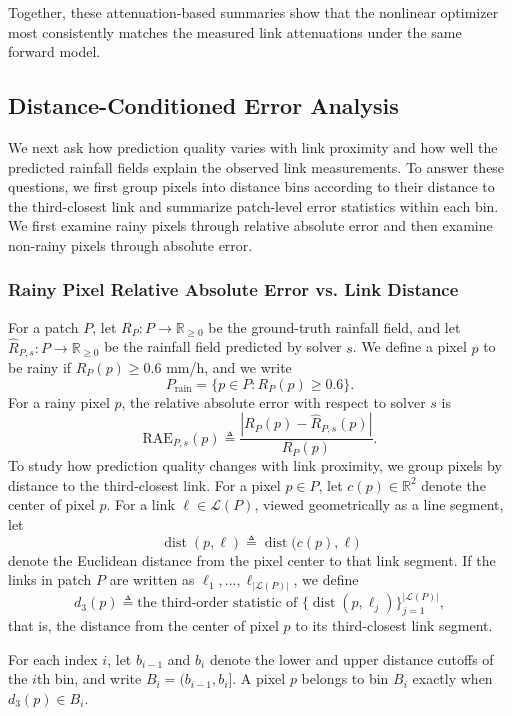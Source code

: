 Together, these attenuation-based summaries show that the nonlinear optimizer most consistently matches the measured link attenuations under the same forward model.

\subsection{Distance-Conditioned Error Analysis}
We next ask how prediction quality varies with link proximity and how well the predicted rainfall fields explain the observed link measurements. To answer these questions, we first group pixels into distance bins according to their distance to the third-closest link and summarize patch-level error statistics within each bin. We first examine rainy pixels through relative absolute error and then examine non-rainy pixels through absolute error.

\subsubsection{Rainy Pixel Relative Absolute Error vs. Link Distance}
For a patch $P$, let $R_P : P \to \mathbb{R}_{\ge 0}$ be the ground-truth rainfall field, and let $\widehat{R}_{P,s} : P \to \mathbb{R}_{\ge 0}$ be the rainfall field predicted by solver $s$. We define a pixel $p$ to be rainy if $R_P(p) \ge 0.6$ mm/h, and we write
\[
P_{\mathrm{rain}}=\{p \in P : R_P(p)\ge 0.6\}.
\]
For a rainy pixel $p$, the relative absolute error with respect to solver $s$ is
\[
\mathrm{RAE}_{P,s}(p)\triangleq\frac{|R_P(p)-\widehat{R}_{P,s}(p)|}{R_P(p)}.
\]
To study how prediction quality changes with link proximity, we group pixels by distance to the third-closest link. For a pixel $p\in P$, let $c(p)\in\mathbb{R}^2$ denote the center of pixel $p$. For a link $\ell\in\mathcal{L}(P)$, viewed geometrically as a line segment, let
\[
\operatorname{dist}(p,\ell)\triangleq \operatorname{dist}\bigl(c(p),\ell\bigr)
\]
denote the Euclidean distance from the pixel center to that link segment. If the links in patch $P$ are written as $\ell_1,\dots,\ell_{|\mathcal{L}(P)|}$, we define
\[
d_3(p)\triangleq \text{the third-order statistic of } \bigl\{\operatorname{dist}(p,\ell_j)\bigr\}_{j=1}^{|\mathcal{L}(P)|},
\]
that is, the distance from the center of pixel $p$ to its third-closest link segment.

For each index $i$, let $b_{i-1}$ and $b_i$ denote the lower and upper distance cutoffs of the $i$th bin, and write $B_i=(b_{i-1},b_i]$. A pixel $p$ belongs to bin $B_i$ exactly when $d_3(p)\in B_i$.

